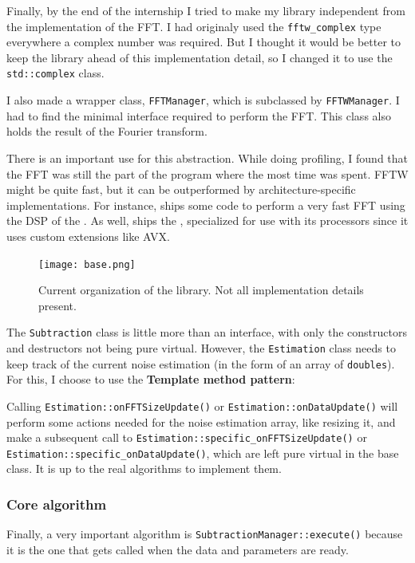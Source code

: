Finally, by the end of the internship I tried to make my library independent from the implementation of the \ac{FFT}. I had originaly used the \texttt{fftw\_complex} type everywhere a complex number was required. But I thought it would be better to keep the library ahead of this implementation detail, so I changed it to use the \texttt{std::complex} class.

I also made a wrapper class, \texttt{FFTManager}, which is subclassed by \texttt{FFTWManager}. I had to find the minimal interface required to perform the \ac{FFT}. This class also holds the result of the Fourier transform.

There is an important use for this abstraction. While doing profiling, I found that the \ac{FFT} was still the part of the program where the most time was spent. \ac{FFTW} might be quite fast, but it can be outperformed by architecture-specific implementations. For instance,  ships some code to perform a very fast \ac{FFT} using the \ac{DSP} of the . As well,  ships the , specialized for use with its processors since it uses custom extensions like \ac{AVX}.

\begin{figure}[h]
\begin{center}
\texttt{[image: base.png]}
\caption{Current organization of the library. Not all implementation details present.}
\label{diag_api_chords}
\end{center}
\end{figure} 

The \texttt{Subtraction} class is little more than an interface, with only the constructors and destructors not being pure virtual. However, the \texttt{Estimation} class needs to keep track of the current noise estimation (in the form of an array of \texttt{doubles}). For this, I choose to use the \textbf{Template method pattern}:

Calling \texttt{Estimation::onFFTSizeUpdate()} or \texttt{Estimation::onDataUpdate()} will perform some actions needed for the noise estimation array, like resizing it, and make a subsequent call to \texttt{Estimation::specific\_onFFTSizeUpdate()} or \texttt{Estimation::specific\_onDataUpdate()}, which are left pure virtual in the base class. It is up to the real algorithms to implement them.
\newpage
\subsubsection{Core algorithm}
Finally, a very important algorithm is \texttt{SubtractionManager::execute()} because it is the one that gets called when the data and parameters are ready.

